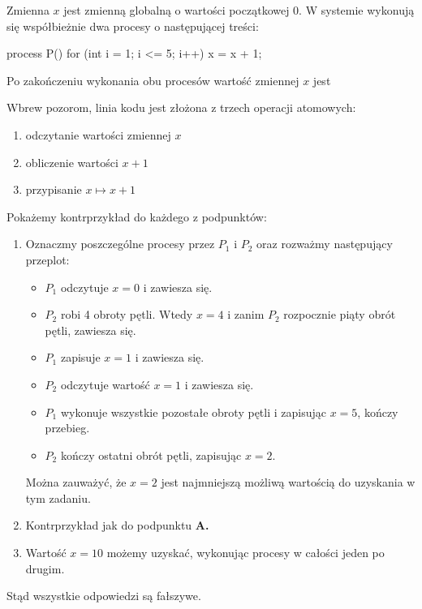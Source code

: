 \begin{exam}
    Zmienna $x$ jest zmienną globalną o wartości początkowej 0. W systemie wykonują się współbieżnie dwa procesy o następującej treści:
    \begin{java}
        process P() {
            for (int i = 1; i <= 5; i++)
                x = x + 1;
        }
    \end{java}
    Po zakończeniu wykonania obu procesów wartość zmiennej $x$ jest
    \bigskip

    Wbrew pozorom, linia kodu  jest złożona z trzech operacji atomowych:
    \begin{enumerate}
        \item odczytanie wartości zmiennej $x$
        \item obliczenie wartości $x + 1$
        \item przypisanie $x \mapsto x + 1$
    \end{enumerate}
    Pokażemy kontrprzykład do każdego z podpunktów:
    \begin{enumerate}[\bf A.]
        \item Oznaczmy poszczególne procesy przez $P_1$ i $P_2$ oraz rozważmy następujący przeplot:
        \begin{itemize}
            \item $P_1$ odczytuje $x = 0$ i zawiesza się.
            \item $P_2$ robi 4 obroty pętli. Wtedy $x = 4$ i zanim $P_2$ rozpocznie piąty obrót pętli, zawiesza się.
            \item $P_1$ zapisuje $x = 1$ i zawiesza się.
            \item $P_2$ odczytuje wartość $x = 1$ i zawiesza się.
            \item $P_1$ wykonuje wszystkie pozostałe obroty pętli i zapisując $x = 5$, kończy przebieg.
            \item $P_2$ kończy ostatni obrót pętli, zapisując $x = 2$.
        \end{itemize}
        Można zauważyć, że $x = 2$ jest najmniejszą możliwą wartością do uzyskania w tym zadaniu.

        \item Kontrprzykład jak do podpunktu \textbf{A.}
        
        \item Wartość $x = 10$ możemy uzyskać, wykonując procesy w całości jeden po drugim.
    \end{enumerate}
    Stąd wszystkie odpowiedzi są fałszywe.
\end{exam}

